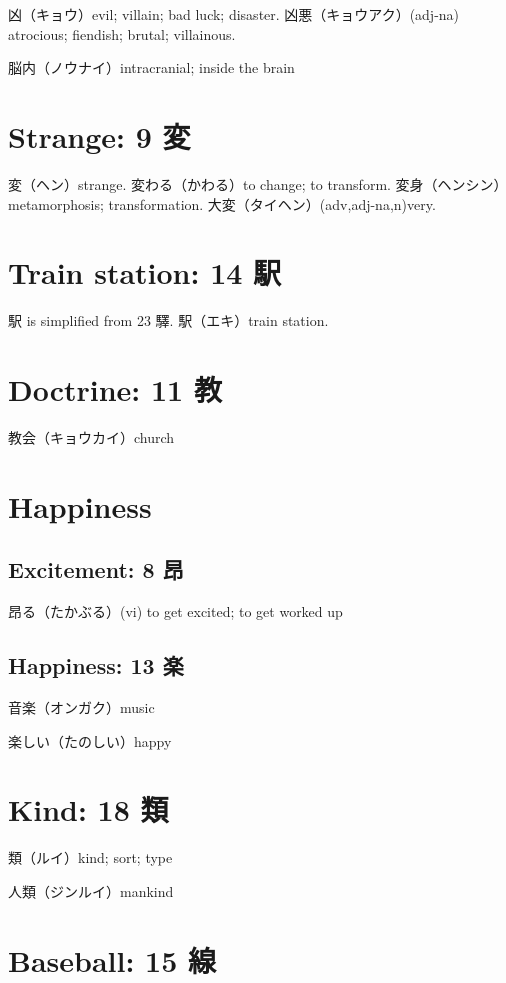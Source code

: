 凶（キョウ）evil; villain; bad luck; disaster.
凶悪（キョウアク）(adj-na) atrocious; fiendish; brutal; villainous.

脳内（ノウナイ）intracranial; inside the brain

\section{Strange: 9 変}

変（ヘン）strange.
変わる（かわる）to change; to transform.
変身（ヘンシン）metamorphosis; transformation.
大変（タイヘン）(adv,adj-na,n)very.

\section{Train station: 14 駅}

駅 is simplified from 23 驛.
駅（エキ）train station.

\section{Doctrine: 11 教}

教会（キョウカイ）church

\section{Happiness}

\subsection{Excitement: 8 昂}

昂る（たかぶる）(vi) to get excited; to get worked up

\subsection{Happiness: 13 楽}

音楽（オンガク）music

楽しい（たのしい）happy

\section{Kind: 18 類}

類（ルイ）kind; sort; type

人類（ジンルイ）mankind

\section{Baseball: 15 線}

